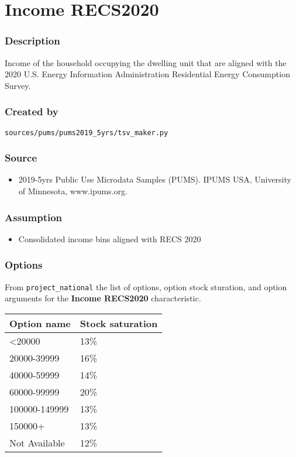 \section{Income RECS2020}\label{income_recs2020}

\subsubsection{Description}\label{description-98}

Income of the household occupying the dwelling unit that are aligned
with the 2020 U.S. Energy Information Administration Residential Energy
Consumption Survey.

\subsubsection{Created by}\label{created-by-98}

\texttt{sources/pums/pums2019\_5yrs/tsv\_maker.py}

\subsubsection{Source}\label{source-97}

\begin{itemize}
 
\item
  2019-5yrs Public Use Microdata Samples (PUMS). IPUMS USA, University
  of Minnesota, www.ipums.org.
\end{itemize}

\subsubsection{Assumption}\label{assumption-59}

\begin{itemize}
 
\item
  Consolidated income bins aligned with RECS 2020
\end{itemize}

\subsubsection{Options}\label{options-98}

From \texttt{project\_national} the list of options, option stock
sturation, and option arguments for the \textbf{Income RECS2020}
characteristic.

\begin{longtable}[]{@{}ll@{}}
\toprule\noalign{}
Option name & Stock saturation \\
\midrule\noalign{}
\endhead
\bottomrule\noalign{}
\endlastfoot
\textless20000 & 13\% \\
20000-39999 & 16\% \\
40000-59999 & 14\% \\
60000-99999 & 20\% \\
100000-149999 & 13\% \\
150000+ & 13\% \\
Not Available & 12\% \\
\end{longtable}




